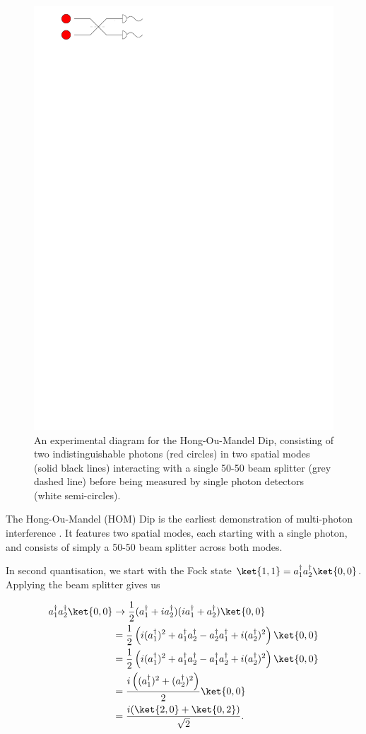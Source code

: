 \begin{figure}
\begin{center}
\includegraphics[width=0.45\linewidth]{preliminary_bs/hom}
\end{center}
\caption[Experimental setup of the Hong-Ou-Mandel Dip]{\label{fig:hom}An experimental diagram for the Hong-Ou-Mandel Dip, consisting of two indistinguishable photons (red circles) in two spatial modes (solid black lines) interacting with a single 50-50 beam splitter (grey dashed line) before being measured by single photon detectors (white semi-circles).}
\end{figure}

The Hong-Ou-Mandel (HOM) Dip is the earliest demonstration of multi-photon interference \cite{hong1987}. It features two spatial modes, each starting with a single photon, and consists of simply a 50-50 beam splitter across both modes.

In second quantisation, we start with the Fock state $\ket{1,1} = a_1^\dagger a_2^\dagger\ket{0,0}$. Applying the beam splitter gives us

\begin{align}
a_1^\dagger a_2^\dagger\ket{0,0} &\rightarrow \frac{1}{2}(a_1^\dagger+ia_2^\dagger)(ia_1^\dagger+a_2^\dagger)\ket{0,0}\\
&= \frac{1}{2}\left(i(a_1^\dagger)^2+a_1^\dagger a_2^\dagger-a_2^\dagger a_1^\dagger+i(a_2^\dagger)^2\right)\ket{0,0}\\
&= \frac{1}{2}\left(i(a_1^\dagger)^2+a_1^\dagger a_2^\dagger-a_1^\dagger a_2^\dagger+i(a_2^\dagger)^2\right)\ket{0,0}\\
&= \frac{i\left((a_1^\dagger)^2+(a_2^\dagger)^2\right)}{2}\ket{0,0}\\
&= \frac{i(\ket{2,0} + \ket{0,2})}{\sqrt{2}}.
\end{align}


